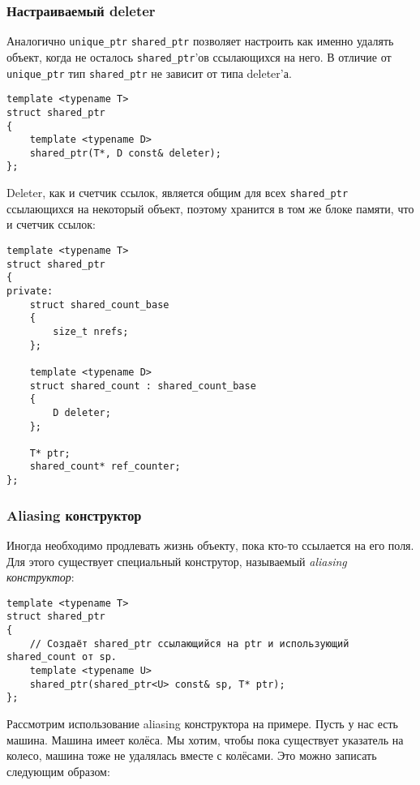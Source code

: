 \subsubsection{Настраиваемый deleter}
\label{shared_ptr_custom_deleter}

Аналогично \texttt{unique_ptr} \texttt{shared_ptr} позволяет настроить как именно удалять объект, когда не осталось \texttt{shared_ptr}'ов ссылающихся на него. В отличие от \texttt{unique_ptr} тип \texttt{shared_ptr} не зависит от типа deleter'а.

\begin{verbatim}
template <typename T>
struct shared_ptr
{
    template <typename D>
    shared_ptr(T*, D const& deleter);
};
\end{verbatim}

Deleter, как и счетчик ссылок, является общим для всех \texttt{shared_ptr} ссылающихся на некоторый объект, поэтому хранится в том же блоке памяти, что и счетчик ссылок:

\begin{verbatim}
template <typename T>
struct shared_ptr
{
private:
    struct shared_count_base
    {
        size_t nrefs;
    };

    template <typename D>
    struct shared_count : shared_count_base
    {
        D deleter;
    };

    T* ptr;
    shared_count* ref_counter;
};
\end{verbatim}

\subsubsection{Aliasing конструктор}
\label{aliasing_constructor}
Иногда необходимо продлевать жизнь объекту, пока кто-то ссылается на его поля. Для этого существует специальный конструтор, называемый {\it aliasing конструктор}:

\begin{verbatim}
template <typename T>
struct shared_ptr
{
    // Создаёт shared_ptr ссылающийся на ptr и использующий shared_count от sp.
    template <typename U>
    shared_ptr(shared_ptr<U> const& sp, T* ptr);
};
\end{verbatim}

Рассмотрим использование aliasing конструктора на примере. Пусть у нас есть машина. Машина имеет колёса. Мы хотим, чтобы пока существует указатель на колесо, машина тоже не удалялась вместе с колёсами. Это можно записать следующим образом:

